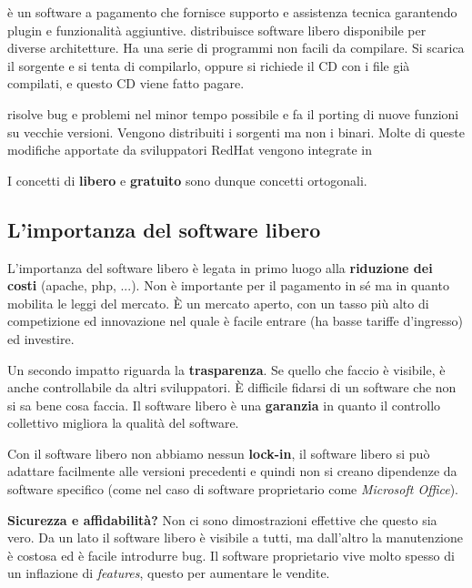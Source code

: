  è un software a pagamento che fornisce supporto e assistenza tecnica garantendo plugin e funzionalità aggiuntive. 
 distribuisce software libero disponibile per diverse architetture. Ha una serie di programmi non facili da compilare. Si scarica il sorgente e si tenta di compilarlo, oppure si richiede il CD con i file già compilati, e questo CD viene fatto pagare.

 risolve bug e problemi nel minor tempo possibile e fa il porting di nuove funzioni su vecchie versioni. Vengono distribuiti i sorgenti ma non i binari. Molte di queste modifiche apportate da sviluppatori RedHat vengono integrate in 

I concetti di \textbf{libero} e \textbf{gratuito} sono dunque concetti ortogonali.

\subsection{L'importanza del software libero}

L'importanza del software libero è legata in primo luogo alla \textbf{riduzione dei costi} (apache, php, ...). Non è importante per il pagamento in sé ma in quanto mobilita le leggi del mercato. È un mercato aperto, con un tasso più alto di competizione ed innovazione nel quale è facile entrare (ha basse tariffe d'ingresso) ed investire.

Un secondo impatto riguarda la \textbf{trasparenza}. Se quello che faccio è visibile, è anche controllabile da altri sviluppatori. È difficile fidarsi di un software che non si sa bene cosa faccia. Il software libero è una \textbf{garanzia} in quanto il controllo collettivo migliora la qualità del software.

Con il software libero non abbiamo nessun \textbf{lock-in}, il software libero si può adattare facilmente alle versioni precedenti e quindi non si creano dipendenze da software specifico (come nel caso di software proprietario come \textit{Microsoft Office}).

\textbf{Sicurezza e affidabilità?} Non ci sono dimostrazioni effettive che questo sia vero. Da un lato il software libero è visibile a tutti, ma dall'altro la manutenzione è costosa ed è facile introdurre bug. Il software proprietario vive molto spesso di un inflazione di \textit{features}, questo per aumentare le vendite.


